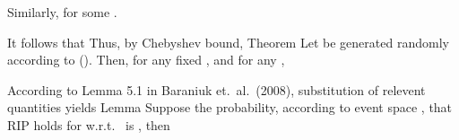 
Similarly, for some .


It follows that
Thus, by Chebyshev bound,
\Result
{Theorem}
{
Let  be generated randomly according to ().
Then, for any fixed , and for any ,
}

According to Lemma 5.1 in Baraniuk et.\ al.\ (2008), substitution of relevent quantities yields
\Result
{Lemma}
{
Suppose the probability, according to event space , that RIP holds for  w.r.t.\  is , then
}

\stopsubsection
\stopsection



